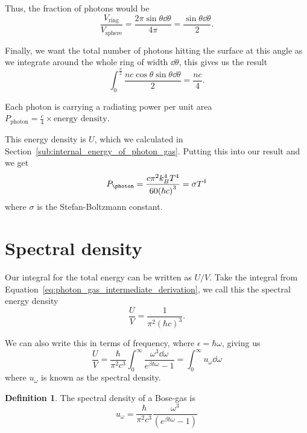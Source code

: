 \documentclass[12pt,chapterprefix=false,dvipsnames]{scrbook}
\theoremstyle{dotless}
\theoremstyle{definition}
\newtheorem{protodefinition}{Definition}[section]
\newenvironment{definition}
{\colorlet{shadecolor}{black!15}\begin{shaded}\begin{protodefinition}}
			{\end{protodefinition}\end{shaded}}
\begin{document}
Thus, the fraction of photons would be
\begin{equation}
	\frac{V_\mathrm{ring}}{V_\mathrm{sphere}}
	=
	\frac{2\pi\sin{\theta}\dd{\theta}}{4\pi}
	=
	\frac{\sin{\theta}\dd{\theta}}{2}.
\end{equation}

Finally, we want the total number of photons hitting the surface
at this angle as we integrate around the whole ring of width
$\dd{\theta}$, this gives us the result
\begin{equation}
	\int^{\frac{\pi}{2}}_0\frac{nc\cos{\theta}\sin{\theta}\dd{\theta}}{2}
	=
	\frac{nc}{4}.
\end{equation}

Each photon is carrying a radiating power per unit area
$ P_{\mathrm{photon}} =
	\frac{c}{4}\times\textrm{energy density}$.

This energy density is $U$, which we
calculated in Section~\ref{sub:internal_energy_of_photon_gas}. Putting this
into our result and we get
\begin{equation}
	P_\mathrm{\photon} = \frac{c\pi^2k_B^4T^4}{60{\left(\hbar c\right)}^3} = \sigma T^4
\end{equation}
where $\sigma$ is the Stefan-Boltzmann constant.

\section{Spectral density}%
\label{sec:spectral_density}

Our integral for the total energy can be written as
$U/V$. Take the integral from
Equation~\ref{eq:photon_gas_intermediate_derivation}, we call this the spectral
energy density
\begin{equation}
	\frac{U}{V} =
	\frac{1}{\pi^2{\left(\hbar c\right)}^3}.
\end{equation}

We can also write this in terms of frequency, where
$\epsilon = \hbar\omega$, giving us
\begin{equation}
	\frac{U}{V}
	=
	\frac{\hbar}{\pi^2 c^3}\int^\infty_0
	\frac{\omega^3\dd{\omega}}{e^{\beta\hbar\omega} - 1}
	=
	\int^\infty_0 u_\omega\dd{\omega}
\end{equation}
where $u_\omega$ is known as the spectral density.

\begin{definition}
	The spectral density of a Bose-gas is
	\begin{equation}
		\label{eq:spectral_density}
		u_{\omega}
		=
		\frac{\hbar}{\pi^2 c^3}\frac{\omega^3}{\left(e^{\beta\hbar\omega} - 1\right)}
	\end{equation}
\end{definition}
\end{document}
